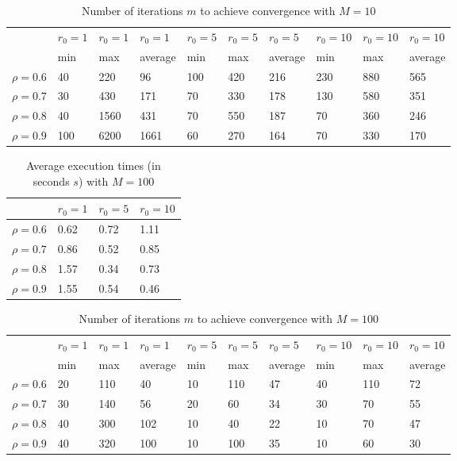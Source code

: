 \documentclass[a4paper,11pt,openright]{report}
\begin{document}
\begin{table}[H]
\centering
\addtolength{\leftskip}{-1.5cm}
\addtolength{\rightskip}{-1.5cm}
\begin{tabular}{|c|lllllllll|}
\hline
$ $ & $r_0 = 1$ & $r_0 = 1$ & $r_0 = 1$ & $r_0 = 5$ & $r_0 = 5$ & $r_0 = 5$ & $r_0 = 10$ & $r_0 = 10$ & $r_0 = 10$  \\
$ $ & min & max & average & min & max & average & min & max & average \\ 
\hline
$\rho = 0.6$ & 40 & 220 & 96 & 100 & 420 & 216 & 230 & 880 & 565 \\

$\rho = 0.7$ & 30 & 430 & 171 & 70 & 330 & 178 & 130 & 580 & 351\\

$\rho = 0.8$ & 40 & 1560 & 431 & 70 & 550 & 187 & 70 & 360 & 246\\

$\rho = 0.9$ & 100 & 6200 & 1661 & 60 & 270 & 164 & 70 & 330 & 170\\
\hline
\end{tabular}
\caption{Number of iterations $m$ to achieve convergence with $M = 10$}
\end{table}
\begin{table}[H]
\centering
\addtolength{\leftskip}{-1.5cm}
\addtolength{\rightskip}{-1.5cm}
\begin{tabular}{|c|lll|}
\hline
$ $ & $r_0 = 1$ & $r_0 = 5$ & $r_0 = 10$ \\
\hline
$\rho = 0.6$ & 0.62 & 0.72 & 1.11 \\

$\rho = 0.7$ & 0.86 & 0.52 & 0.85 \\

$\rho = 0.8$ & 1.57 & 0.34 & 0.73 \\

$\rho = 0.9$ & 1.55 & 0.54 & 0.46 \\
\hline
\end{tabular}
\caption{Average execution
 times (in seconds $s$) with $M = 100$}
\end{table}
\begin{table}[H]
\centering
\addtolength{\leftskip}{-1.5cm}
\addtolength{\rightskip}{-1.5cm}
\begin{tabular}{|c|lllllllll|}
\hline
$ $ & $r_0 = 1$ & $r_0 = 1$ & $r_0 = 1$ & $r_0 = 5$ & $r_0 = 5$ & $r_0 = 5$ & $r_0 = 10$ & $r_0 = 10$ & $r_0 = 10$  \\
$ $ & min & max & average & min & max & average & min & max & average \\ 
\hline
$\rho = 0.6$ & 20 & 110 & 40 & 10 & 110 & 47 & 40 & 110 & 72\\

$\rho = 0.7$ & 30 & 140 & 56 & 20 & 60 & 34 & 30 & 70 & 55\\

$\rho = 0.8$ & 40 & 300 & 102 & 10 & 40 & 22 & 10 & 70 & 47\\

$\rho = 0.9$ & 40 & 320 & 100 & 10 & 100 & 35 & 10 & 60 & 30\\
\hline
\end{tabular}
\caption{Number of iterations $m$ to achieve convergence with $M = 100$}
\end{table}
\end{document}
